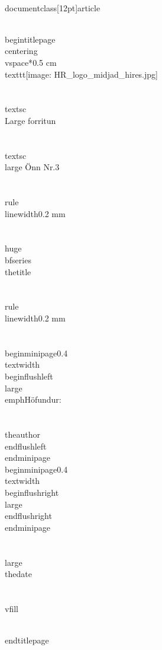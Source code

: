 \\documentclass[12pt]{article}
\begin{document}

\\begin{titlepage}
    \\centering
    \\vspace*{0.5 cm}
    \\texttt{[image: HR\_logo\_midjad\_hires.jpg]}\\\\[1.0 cm]	%
    \\textsc{\\Large forritun}\\\\[0.5 cm]				%
    \\textsc{\\large Önn Nr.3}\\\\[0.5 cm]				%
    \\rule{\\linewidth}{0.2 mm} \\\\[0.4 cm]
    { \\huge \\bfseries \\thetitle}\\\\
    \\rule{\\linewidth}{0.2 mm} \\\\[1.5 cm]
    
    \\begin{minipage}{0.4\\textwidth}
        \\begin{flushleft} \\large
            \\emph{Höfundur:}\\\\
            \\theauthor
            \\end{flushleft}
            \\end{minipage}~
            \\begin{minipage}{0.4\\textwidth}
            \\begin{flushright} \\large
        \\end{flushright}
    \\end{minipage}\\\\[2 cm]
    
    {\\large \\thedate}\\\\[2 cm]

    \\vfill
    
\\end{titlepage}


\
\end{document}
